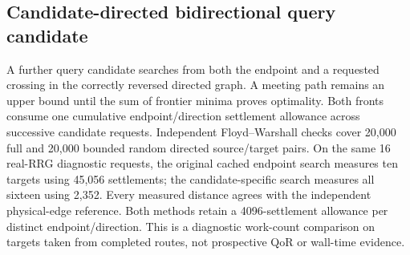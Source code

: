 \documentclass[conference,10pt]{IEEEtran}
\begin{document}
\subsection{Candidate-directed bidirectional query candidate}
A further query candidate searches from both the endpoint and a requested crossing in the correctly reversed directed graph. A meeting path remains an upper bound until the sum of frontier minima proves optimality. Both fronts consume one cumulative endpoint/direction settlement allowance across successive candidate requests. Independent Floyd--Warshall checks cover 20,000 full and 20,000 bounded random directed source/target pairs. On the same 16 real-RRG diagnostic requests, the original cached endpoint search measures ten targets using 45,056 settlements; the candidate-specific search measures all sixteen using 2,352. Every measured distance agrees with the independent physical-edge reference. Both methods retain a 4096-settlement allowance per distinct endpoint/direction. This is a diagnostic work-count comparison on targets taken from completed routes, not prospective QoR or wall-time evidence.
\end{document}
